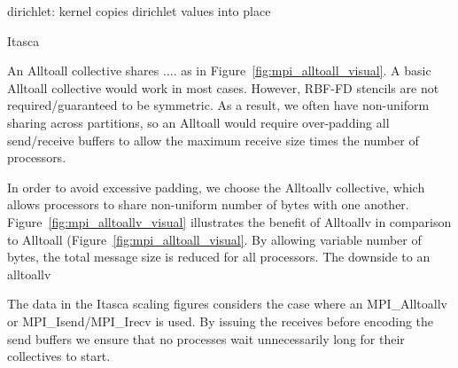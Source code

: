 
dirichlet: kernel copies dirichlet values into place 





 



Itasca

An Alltoall collective shares .... as in Figure~\ref{fig:mpi_alltoall_visual}. A basic Alltoall collective would work in most cases. However, RBF-FD stencils are not required/guaranteed to be symmetric. As a result, we often have non-uniform sharing across partitions, so an Alltoall would require over-padding all send/receive buffers to allow the maximum receive size times the number of processors. 

In order to avoid excessive padding, we choose the Alltoallv collective, which allows processors to share non-uniform number of bytes with one another. Figure~\ref{fig:mpi_alltoallv_visual} illustrates the benefit of Alltoallv in comparison to Alltoall (Figure~\ref{fig:mpi_alltoall_visual}. By allowing variable number of bytes, the total message size is reduced for all processors. The downside to an alltoallv




The data in the Itasca scaling figures considers the case where an MPI\_Alltoallv or MPI\_Isend/MPI\_Irecv is used. By issuing the receives before encoding the send buffers we ensure that no processes wait unnecessarily long for their collectives to start.

